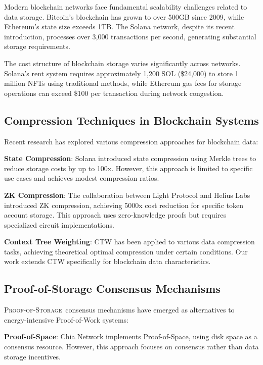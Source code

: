 \documentclass[11pt,a4paper]{article}
\newcommand{\ProofOfStorage}{\textsc{Proof-of-Storage}}
\begin{document}
Modern blockchain networks face fundamental scalability challenges related to data storage. Bitcoin's blockchain has grown to over 500GB since 2009\cite{bitcoin_size_2024}, while Ethereum's state size exceeds 1TB\cite{ethereum_state_2024}. The Solana network, despite its recent introduction, processes over 3,000 transactions per second, generating substantial storage requirements\cite{solana_tps_2024}.

The cost structure of blockchain storage varies significantly across networks. Solana's rent system requires approximately 1,200 SOL (\$24,000) to store 1 million NFTs using traditional methods\cite{solana_storage_costs}, while Ethereum gas fees for storage operations can exceed \$100 per transaction during network congestion\cite{ethereum_gas_2024}.

\subsection{Compression Techniques in Blockchain Systems}

Recent research has explored various compression approaches for blockchain data:

\textbf{State Compression}: Solana introduced state compression using Merkle trees to reduce storage costs by up to 100x\cite{solana_state_compression}. However, this approach is limited to specific use cases and achieves modest compression ratios.

\textbf{ZK Compression}: The collaboration between Light Protocol and Helius Labs introduced ZK compression, achieving 5000x cost reduction for specific token account storage\cite{solana_zk_compression}. This approach uses zero-knowledge proofs but requires specialized circuit implementations.

\textbf{Context Tree Weighting}: CTW has been applied to various data compression tasks, achieving theoretical optimal compression under certain conditions\cite{ctw_theory}. Our work extends CTW specifically for blockchain data characteristics.

\subsection{Proof-of-Storage Consensus Mechanisms}

\ProofOfStorage\ consensus mechanisms have emerged as alternatives to energy-intensive Proof-of-Work systems:

\textbf{Proof-of-Space}: Chia Network implements Proof-of-Space, using disk space as a consensus resource\cite{chia_consensus}. However, this approach focuses on consensus rather than data storage incentives.
\end{document}
